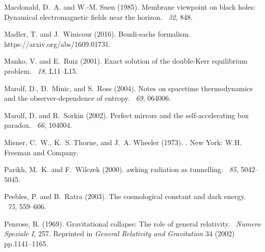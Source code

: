 \documentclass[12pt]{article}
\begin{document}
\begin{thebibliography}{}
Macdonald, D.~A. and W.-M. Suen (1985).
\newblock Membrane viewpoint on black holes: Dynamical electromagnetic fields
  near the horizon.
~{\em 32}, 848.

Madler, T. and J.~Winicour (2016).
\newblock Bondi-sachs formalism.
\newblock https://arxiv.org/abs/1609.01731.

Manko, V. and E.~Ruiz (2001).
\newblock Exact solution of the double-{K}err equilibrium problem.
~{\em 18}, L11--L15.

Marolf, D., D.~Minic, and S.~Ross (2004).
\newblock Notes on spacetime thermodynamics and the observer-dependence of
  entropy.
~{\em 69}, 064006.

Marolf, D. and R.~Sorkin (2002).
\newblock Perfect mirrors and the self-accelerating box paradox.
~{\em 66}, 104004.

Misner, C.~W., K.~S. Thorne, and J.~A. Wheeler (1973).
.
\newblock New York: W.H. Freeman and Company.

Parikh, M.~K. and F.~Wilczek (2000).
awking radiation as tunnelling.
~{\em 85}, 5042--5045.

Peebles, P. and B.~Ratra (2003).
\newblock The cosmological constant and dark energy.
~{\em 75}, 559--606.

Penrose, R. (1969).
\newblock Gravitational collapse: The role of general relativity.
~{\em Numero Speziale I}, 257.
\newblock Reprinted in \emph{General Relativity and Gravitation} 34 (2002)
  pp.1141--1165.


\end{thebibliography}
\end{document}
